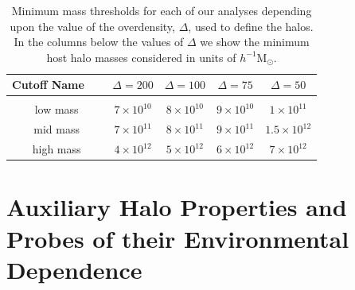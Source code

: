 \documentclass[usenatbib,usegraphicx,letterpaper]{mn2e}
\begin{document}
\begin{table}
\caption{
Minimum mass thresholds for each of our analyses depending upon the 
value of the overdensity, $\Delta$, used to define the halos. 
In the columns below the values of $\Delta$ we show the minimum 
host halo masses considered in units of $h^{-1}\mathrm{M}_{\odot}$.
}
\vspace*{8pt}
\begin{tabular}{ c c c c c }
\hline
\hline
Cutoff Name \ \  & $\Delta=200$ & $\Delta=100$ & $\Delta=75$ & $\Delta=50$ \\
\hline
\\{low mass} & $7 \times 10^{10}$ & $8 \times 10^{10}$ & $9 \times 10^{10}$ & $1 \times 10^{11}$  \\
{mid mass} & $7 \times 10^{11}$ & $8 \times 10^{11}$ & $9 \times 10^{11}$ & $1.5 \times 10^{12}$ \\
{high mass} & $4 \times 10^{12}$ & $5 \times 10^{12}$ & $6 \times 10^{12}$ & $7 \times 10^{12}$ \\
\hline
\hline
\end{tabular}
\label{table:thresholds}
\end{table}


\section[]{Auxiliary Halo Properties and Probes of their Environmental Dependence}
\label{section:methodology}
\end{document}
